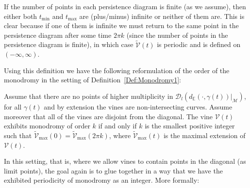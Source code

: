 \documentclass[twoside,leqno]{article}
\newcommand{\M}{\mathcal{M}}
\newcommand{\Per}{\mathscr{D}}
\begin{document}
If the number of points in each persistence diagram is finite (as we assume), then either both $t_{\min}$ and $t_{\max}$ are (plus/minus) infinite or neither of them are. This is clear because if one of them is infinite we must return to the same point in the persistence diagram after some time $2 \pi k$ (since the number of points in the persistence diagram is finite), in which case $\tilde{\mathcal{V}} (t)$  is periodic and is defined on  $(-\infty ,\infty)$. 

Using this definition we have the following reformulation of the order of the monodromy in the setting of Definition~\ref{Def:Monodromy1}:
\begin{remark}\label{rem:ReformulationMonodromy1}
Assume that there are no points of higher multiplicity in $\Per_l (d_\mathbb{E}(\cdot, \gamma(t) )|_\M)$, for all $\gamma(t)$ and by extension the vines are non-intersecting curves. Assume moreover that all of the vines are disjoint from the diagonal.
The vine $\mathcal{V} (t)$  exhibits monodromy of order $k$ if and only if $k$ is the smallest positive integer such that $\tilde{\mathcal{V}}_{\max} (0)=\tilde{\mathcal{V}}_{\max} (2 \pi k)$, where $\tilde{\mathcal{V}}_{\max} (t)$  is the maximal extension of $\mathcal{V} (t)$.   
\end{remark}



In this setting, that is, where we allow vines to contain points in the diagonal (as limit points), 
the goal again is to glue together in a way that we have the exhibited periodicity of monodromy as an integer.
More formally:
\end{document}
